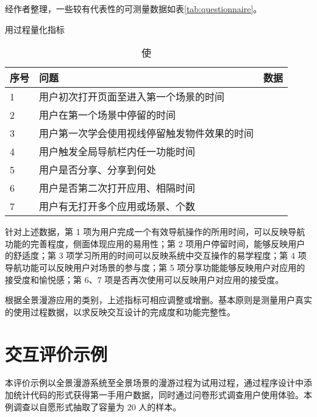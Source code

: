 经作者整理，一些较有代表性的可测量数据如表\ref{tab:questionnaire}。

\begin{table}[htp]
\centering
\caption 使用过程量化指标
\vskip 5pt
\begin{tabular}{lll}
\toprule
序号 & 问题 & 数据 \\
\midrule
1 & 用户初次打开页面至进入第一个场景的时间 & 	\\
2 &  用户在第一个场景中停留的时间 & \\
3 & 用户第一次学会使用视线停留触发物件效果的时间 & \\
4 & 用户触发全局导航栏内任一功能时间 & \\
5 & 用户是否分享、分享到何处 & \\
6 & 用户是否第二次打开应用、相隔时间 & \\
7 & 用户有无打开多个应用或场景、个数 & \\
\bottomrule
\end{tabular}
\label{tab:questionnaire2}
\end{table}

针对上述数据，第 1 项为用户完成一个有效导航操作的所用时间，可以反映导航功能的完善程度，侧面体现应用的易用性；第 2 项用户停留时间，能够反映用户的舒适度；第 3 项学习所用的时间可以反映系统中交互操作的易学程度；第 4 项导航功能可以反映用户对场景的参与度；第 5 项分享功能能够反映用户对应用的接受度和愉悦感；第 6、7 项是否再次使用可以反映用户对应用的接受度。

根据全景漫游应用的类别，上述指标可相应调整或增删。基本原则是测量用户真实的使用过程数据，以求反映交互设计的完成度和功能完整性。


\section{交互评价示例}

本评价示例以全景漫游系统至全景场景的漫游过程为试用过程，通过程序设计中添加统计代码的形式获得第一手用户数据，同时通过问卷形式调查用户使用体验。本例调查以自愿形式抽取了容量为 20 人的样本。

